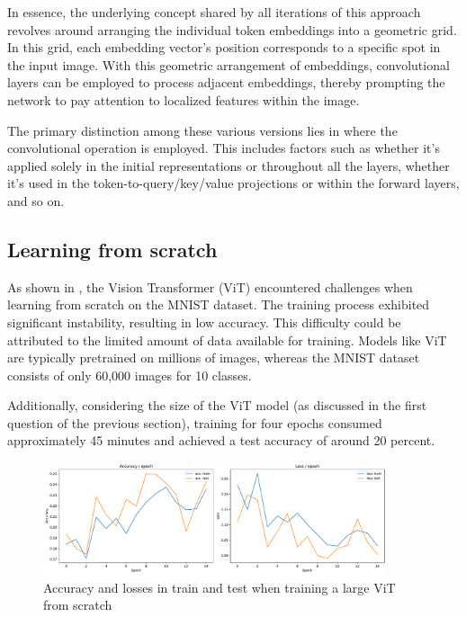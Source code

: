 In essence, the underlying concept shared by all iterations of this approach revolves around arranging the individual token embeddings into a geometric grid. In this grid, each embedding vector's position corresponds to a specific spot in the input image. With this geometric arrangement of embeddings, convolutional layers can be employed to process adjacent embeddings, thereby prompting the network to pay attention to localized features within the image.

The primary distinction among these various versions lies in where the convolutional operation is employed. This includes factors such as whether it's applied solely in the initial representations or throughout all the layers, whether it's used in the token-to-query/key/value projections or within the forward layers, and so on.

\subsection{Learning from scratch}
As shown in , the Vision Transformer (ViT) encountered challenges when learning from scratch on the MNIST dataset. The training process exhibited significant instability, resulting in low accuracy. This difficulty could be attributed to the limited amount of data available for training. Models like ViT are typically pretrained on millions of images, whereas the MNIST dataset consists of only 60,000 images for 10 classes.

Additionally, considering the size of the ViT model (as discussed in the first question of the previous section), training for four epochs consumed approximately 45 minutes and achieved a test accuracy of around 20 percent.

\begin{figure}[H]
    \centering
    \includegraphics*[width=0.9\textwidth]{figs/Transformers/stats_vit_15.pdf}
    \caption{Accuracy and losses in train and test when training a large ViT from scratch}
    \label{fig:stats_vit}
\end{figure}


